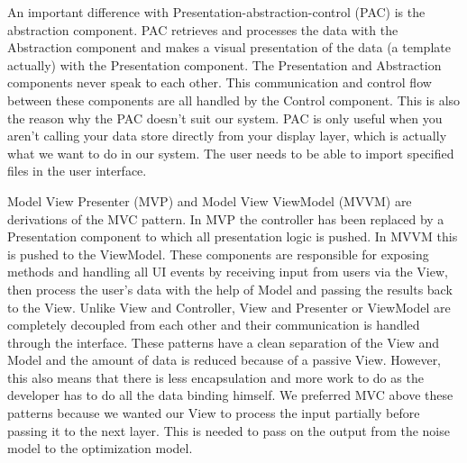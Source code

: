 An important difference with Presentation-abstraction-control (PAC) is the abstraction component. PAC retrieves and processes the data with the Abstraction component and makes a visual presentation of the data (a template actually) with the Presentation component. The Presentation and Abstraction components never speak to each other. This communication and control flow between these components are all handled by the Control component. This is also the reason why the PAC doesn't suit our system. PAC is only useful when you aren't calling your data store directly from your display layer, which is actually what we want to do in our system. The user needs to be able to import specified files in the user interface.
 
Model View Presenter (MVP) and Model View ViewModel (MVVM) are derivations of the MVC pattern. In MVP the controller has been replaced by a Presentation component to which all presentation logic is pushed. In MVVM this is pushed to the ViewModel. These components are responsible for exposing methods and handling all UI events by receiving input from users via the View, then process the user's data with the help of Model and passing the results back to the View. Unlike View and Controller, View and Presenter or ViewModel are completely decoupled from each other and their communication is handled through the interface. These patterns have a clean separation of the View and Model and the amount of data is reduced because of a passive View. However, this also means that there is less encapsulation and more work to do as the developer has to do all the data binding himself. We preferred MVC above these patterns because we wanted our View to process the input partially before passing it to the next layer. This is needed to pass on the output from the noise model to the optimization model.
\\